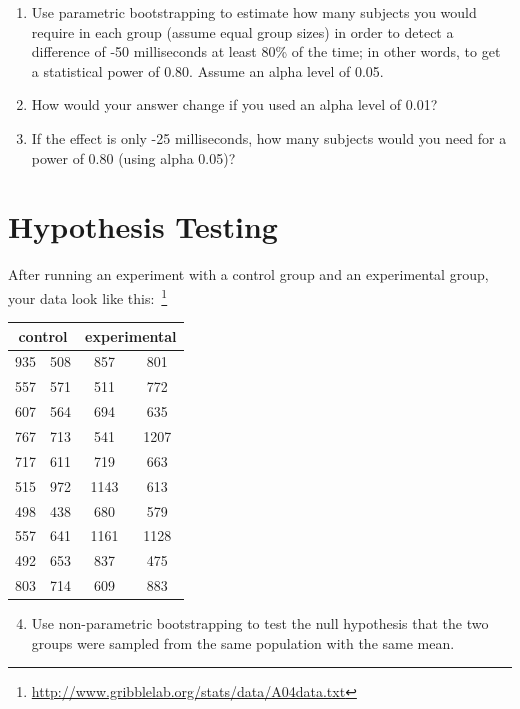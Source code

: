 \documentclass[10pt]{article}
\begin{document}
\begin{enumerate}
\item Use parametric bootstrapping to estimate how many subjects you
  would require in each group (assume equal group sizes) in order to
  detect a difference of -50 milliseconds at least 80\% of the time;
  in other words, to get a statistical power of 0.80. Assume an alpha
  level of 0.05.
  \item How would your answer change if you used an alpha level of 0.01?
  \item If the effect is only -25 milliseconds, how many subjects
    would you need for a power of 0.80 (using alpha 0.05)?
\end{enumerate}


\section*{Hypothesis Testing}

After running an experiment with a control group and an experimental
group, your data look like
this:~\footnote{\url{http://www.gribblelab.org/stats/data/A04data.txt}}

\begin{center}
\begin{tabular}{cc|cc}
\multicolumn{2}{c}{control} &\multicolumn{2}{c}{experimental}\\
\hline
935 &508  &857 &801\\
557 &571  &511 &772\\
607 &564  &694 &635\\
767 &713  &541 &1207\\
717 &611  &719 &663\\
515 &972  &1143 &613\\
498 &438  &680 &579\\
557 &641  &1161 &1128\\
492 &653  &837 &475\\
803 &714  &609 &883\\
\end{tabular}
\end{center}

\begin{enumerate}
\setcounter{enumi}{3}
\item Use non-parametric bootstrapping to test the null hypothesis
  that the two groups were sampled from the same population with the
  same mean.
\end{enumerate}
\end{document}
